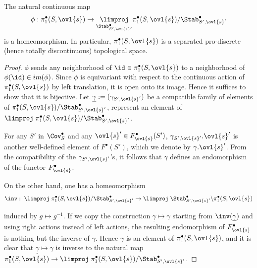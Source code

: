 \begin{lem}\label{lem::1.4.2} The natural continuous map 
 \begin{equation*}
  \phi: \pi_1^\bullet(S,\ovl{s})\to
  \underset{\Stab^\bullet_{S',\ovl{s}'}}{\limproj} 
  \pi_1^\bullet(S,\ovl{s})/\Stab^\bullet_{S',\ovl{s}'}
 \end{equation*}
 is a homeomorphism. In particular,
 $\pi_1^\bullet(S,\ovl{s})$ is a separated pro-discrete (hence totally
 discontinuous) topological space.
\end{lem}

\begin{proof}
 $\phi$ sends any neighborhood of $\id\in
 \pi_1^\bullet(S,\ovl{s})$ to a neighborhood of $\phi(\id)\in
 im(\phi)$. Since $\phi$ is equivariant with respect to the continuous
 action of $\pi_1^\bullet(S,\ovl{s})$ by left translation, it is open
 onto its image. Hence it suffices to show that it is bijective. Let
 $\underline{\gamma}:=(\gamma_{S',\ovl{s}'})$ be a compatible family of
 elements of $\pi_1^\bullet(S,\ovl{s})/\Stab^\bullet_{S',\ovl{s}'}$, \ie
 represent an element of $\limproj\;
 \pi_1^\bullet(S,\ovl{s})/\Stab^\bullet_{S',\ovl{s}'}$.

 \noindent For any $S'$ in $\Cov^{\bullet}_S$ and any $\ovl{s}'\in
 F^\bullet_{\ovl{s}}(S')$, $\gamma_{S',\ovl{s}'}.\ovl{s}'$ is another
 well-defined element of $F^\bullet(S')$, which we denote by
 $\gamma.\ovl{s}'$. From the compatibility of the
 $\gamma_{S',\ovl{s}'}$'s, it follows that $\gamma$ defines an
 endomorphism of the functor $F^\bullet_{\ovl{s}}$.

 On the other hand, one has a homeomorphism 
 \begin{equation*}
 \inv:\; \limproj\; \pi_1^\bullet(S,\ovl{s}) /\Stab^\bullet_{S',\ovl{s}'}
  \to \limproj\;
  \Stab^\bullet_{S',\ovl{s}'}\backslash\pi_1^\bullet(S,\ovl{s})
 \end{equation*}

 \noindent induced by $g\mapsto g^{-1}$. If we copy the construction
 $\underline{\gamma}\mapsto \gamma$ starting from
 $\inv(\underline{\gamma})$ and using right actions instead of left
 actions, the resulting endomorphism of $F^\bullet_{\ovl{s}}$ is nothing
 but the inverse of $\gamma$. Hence $\gamma$ is an element of $
 \pi_1^\bullet(S,\ovl{s})$, and it is clear that
 $\underline{\gamma}\mapsto \gamma$ is inverse to the natural map
 $\displaystyle\pi_1^\bullet(S,\ovl{s})\to \limproj\; 
 \pi_1^\bullet(S,\ovl{s})/\Stab^\bullet_{S',\ovl{s}'}$.
\end{proof}

